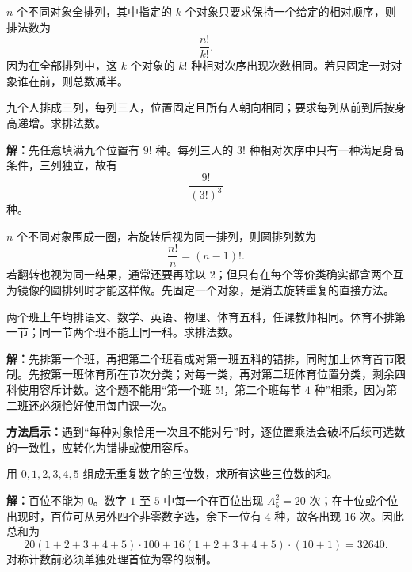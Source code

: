 \begin{corollarybox}[相对顺序固定]
  $n$ 个不同对象全排列，其中指定的 $k$ 个对象只要求保持一个给定的相对顺序，则排法数为
  \[
    \frac{n!}{k!}.
  \]
  因为在全部排列中，这 $k$ 个对象的 $k!$ 种相对次序出现次数相同。若只固定一对对象谁在前，则总数减半。
\end{corollarybox}

\begin{examplebox}
  九个人排成三列，每列三人，位置固定且所有人朝向相同；要求每列从前到后按身高递增。求排法数。

  \textbf{解：}先任意填满九个位置有 $9!$ 种。每列三人的 $3!$ 种相对次序中只有一种满足身高条件，三列独立，故有
  \[
    \frac{9!}{(3!)^3}
  \]
  种。
\end{examplebox}

\begin{corollarybox}[圆排列与翻转等价]
  $n$ 个不同对象围成一圈，若旋转后视为同一排列，则圆排列数为
  \[
    \frac{n!}{n}=(n-1)!.
  \]
  若翻转也视为同一结果，通常还要再除以 $2$；但只有在每个等价类确实都含两个互为镜像的圆排列时才能这样做。先固定一个对象，是消去旋转重复的直接方法。
\end{corollarybox}

\begin{examplebox}
  两个班上午均排语文、数学、英语、物理、体育五科，任课教师相同。体育不排第一节；同一节两个班不能上同一科。求排法数。

  \textbf{解：}先排第一个班，再把第二个班看成对第一班五科的错排，同时加上体育首节限制。先按第一班体育所在节次分类；对每一类，再对第二班体育位置分类，剩余四科使用容斥计数。这个题不能用“第一个班 $5!$，第二个班每节 $4$ 种”相乘，因为第二班还必须恰好使用每门课一次。

  \textbf{方法启示：}遇到“每种对象恰用一次且不能对号”时，逐位置乘法会破坏后续可选数的一致性，应转化为错排或使用容斥。
\end{examplebox}

\begin{examplebox}
  用 $0,1,2,3,4,5$ 组成无重复数字的三位数，求所有这些三位数的和。

  \textbf{解：}百位不能为 $0$。数字 $1$ 至 $5$ 中每一个在百位出现 $A_5^2=20$ 次；在十位或个位出现时，百位可从另外四个非零数字选，余下一位有 $4$ 种，故各出现 $16$ 次。因此总和为
  \[
    20(1+2+3+4+5)\cdot100
    +16(1+2+3+4+5)\cdot(10+1)
    =32640.
  \]
  对称计数前必须单独处理首位为零的限制。
\end{examplebox}


